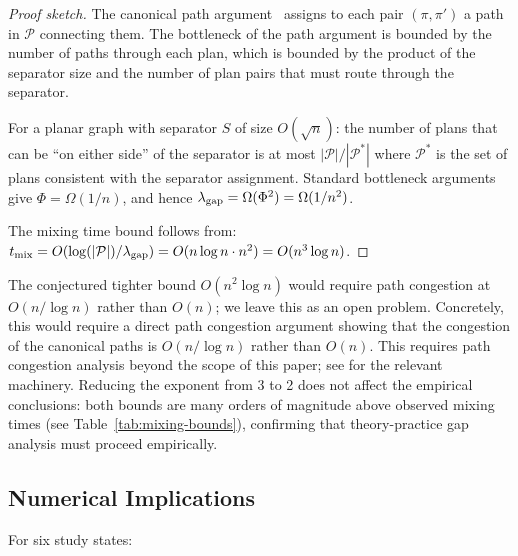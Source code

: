 \begin{proof}[Proof sketch]
The canonical path argument~\citep{diaconis1996} assigns to each pair
$(\pi, \pi')$ a path in $\mathcal{P}$ connecting them.
The bottleneck of the path argument is bounded by the number of paths
through each plan, which is bounded by the product of the separator size
and the number of plan pairs that must route through the separator.

For a planar graph with separator $S$ of size $O(\sqrt{n})$:
the number of plans that can be ``on either side'' of the separator
is at most $|\mathcal{P}| / |\mathcal{P}^*|$ where $\mathcal{P}^*$ is
the set of plans consistent with the separator assignment.
Standard bottleneck arguments give $\Phi = \Omega(1/n)$, and hence
$\lambda_{\mathrm{gap}} = \Omega(\Phi^2) = \Omega(1/n^2)$.

The mixing time bound follows from:
$t_{\mathrm{mix}} = O(\log(|\mathcal{P}|) / \lambda_{\mathrm{gap}}) = O(n \log n \cdot n^2) = O(n^3 \log n)$.
\end{proof}

\begin{remark}
The conjectured tighter bound $O(n^2 \log n)$ would require path congestion
at $O(n/\log n)$ rather than $O(n)$; we leave this as an open problem.
Concretely, this would require a direct path congestion argument showing that
the congestion of the canonical paths is $O(n/\log n)$ rather than $O(n)$.
This requires path congestion analysis beyond the scope of this paper;
see \citet[Theorem~13.1]{levin2009markov} for the relevant machinery.
Reducing the exponent from 3 to 2 does not affect the empirical
conclusions: both bounds are many orders of magnitude above observed mixing
times (see Table~\ref{tab:mixing-bounds}), confirming that theory-practice
gap analysis must proceed empirically.
\end{remark}

\subsection{Numerical Implications}

For six study states:

